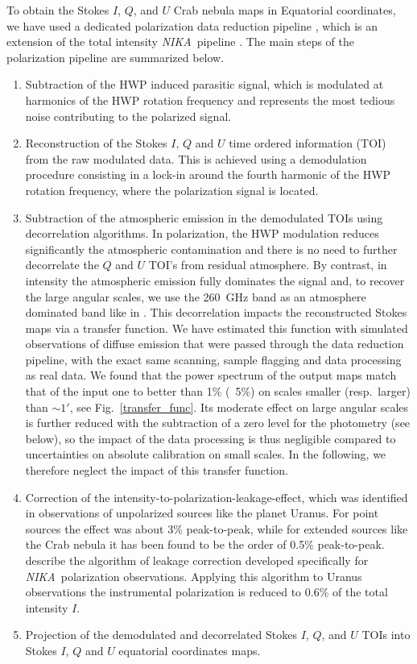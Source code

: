 \documentclass[twocolumn,traditabstract]{aa}
\def\NIKA{\textit{NIKA}}
\begin{document}
To obtain the Stokes $I$, $Q$, and $U$ Crab nebula maps in Equatorial coordinates, we have used a dedicated
polarization data reduction pipeline \citep{ritacco2017}, which is an extension
of the total intensity \NIKA\ pipeline \citep{catalano2014,adam2013}. The main steps
of the polarization pipeline are summarized below.
\begin{enumerate}
\item Subtraction of the HWP induced parasitic signal, which is modulated at harmonics of the HWP rotation frequency and represents the most tedious noise contributing to the polarized signal. 
\item Reconstruction of the Stokes $I$, $Q$ and $U$ time ordered information
  (TOI) from the raw modulated data. This is achieved using a demodulation
  procedure consisting in a lock-in around the fourth harmonic of the HWP rotation frequency, where the polarization signal is located.
\item Subtraction of the atmospheric emission in the demodulated TOIs using
  decorrelation algorithms. In polarization, the HWP modulation reduces
  significantly the atmospheric contamination and there is no need to
  further decorrelate the $Q$ and $U$ TOI's from residual atmosphere. By contrast, in
  intensity the atmospheric emission fully dominates the signal and, to recover
  the large angular scales, we use the 260~GHz band as an atmosphere
  dominated band like in \cite{adam2013}.  This decorrelation impacts the
  reconstructed Stokes maps via a transfer function. We have estimated this function
  with simulated observations of diffuse emission that were passed through the
  data reduction pipeline, with the exact same scanning, sample flagging and data
  processing as real data. We found that the power spectrum of the output maps
  match that of the input one to better than 1\% (~5\%) on scales smaller
  (resp.~larger) than $\sim 1'$, see Fig.~\ref{transfer_func}. Its moderate effect on large angular scales is further reduced with the subtraction of a zero level for the photometry (see below), so the impact of the data processing is thus
  negligible compared to uncertainties on absolute calibration on small
  scales. In the
  following, we therefore neglect the impact of this transfer function.


\item Correction of the intensity-to-polarization-leakage-effect, which was
  identified in observations of unpolarized sources like the planet Uranus. For
  point sources the effect was about 3\% peak-to-peak, while for extended sources like the Crab nebula it has been found to be the order of 0.5\% peak-to-peak. 
  \cite{ritacco2017} describe the algorithm of leakage correction developed specifically for \NIKA\ polarization observations. Applying this algorithm to Uranus observations the instrumental polarization is reduced to 0.6\% of the total intensity $I$.
  \item Projection of the demodulated and decorrelated Stokes $I$, $Q$, and $U$ TOIs into Stokes $I$, $Q$ and $U$ equatorial coordinates maps.

\end{enumerate}
\end{document}
